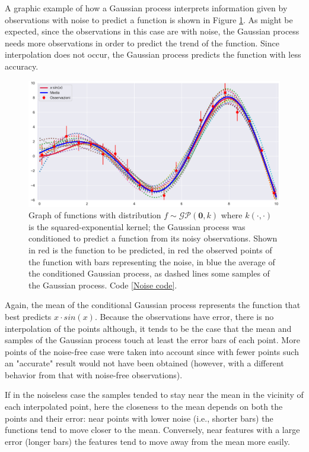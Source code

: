 A graphic example of how a Gaussian process interprets information given by observations with noise to predict a function is shown in Figure \ref{Noisy}.
As might be expected, since the observations in this case are with noise, the Gaussian process needs more observations in order to predict the trend of the function. Since interpolation does not occur, the Gaussian process predicts the function with less accuracy.
\begin{figure}[h]
    \centering
    \includegraphics[width=1\textwidth]{images/Gaussian process/Noise - mean&f(x).pdf}
    \caption{Graph of functions with distribution $f\sim \mathcal{GP}(\bm{0},k)$ where $k(\cdot,\cdot)$ is the squared-exponential kernel; the Gaussian process was conditioned to predict a function from its noisy observations. Shown in red is the function to be predicted, in red the observed points of the function with bars representing the noise, in blue the average of the conditioned Gaussian process, as dashed lines some samples of the Gaussian process. Code \ref{Noise code}.}
    \label{Noisy}
\end{figure}

\newpage

Again, the mean of the conditional Gaussian process represents the function that best predicts $x\cdot sin(x)$. Because the observations have error, there is no interpolation of the points although, it tends to be the case that the mean and samples of the Gaussian process touch at least the error bars of each point.
More points of the noise-free case were taken into account since with fewer points such an "accurate" result would not have been obtained (however, with a different behavior from that with noise-free observations).

If in the noiseless case the samples tended to stay near the mean in the vicinity of each interpolated point, here the closeness to the mean depends on both the points and their error: near points with lower noise (i.e., shorter bars) the functions tend to move closer to the mean. Conversely, near features with a large error (longer bars) the features tend to move away from the mean more easily.


